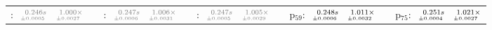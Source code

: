 \documentclass[a4paper,UKenglish]{lipics-v2016}
\begin{document}
\begin{table*}
\begin{adjustbox}{width=1.2\textwidth,center}
\begin{tabular}{rrrp{.1em}rrrp{.1em}rrrp{.1em}rrrp{.1em}rrr}
{\tiny \color{gray}{p$_{11}$}:}&$\substack{\mathmakebox[.7cm][r]{\color{gray}{0.246}}\color{gray}{s}\\{\mathmakebox[.7cm][r]{\scriptscriptstyle \color{gray}{\pm 0.0005}}}}$&$\substack{\mathmakebox[.7cm][r]{\color{gray}{1.000}}\color{gray}{\times}\\{\mathmakebox[.7cm][r]{\scriptscriptstyle \color{gray}{\pm 0.0027}}}}$&&{\tiny \color{gray}{p$_{27}$}:}&$\substack{\mathmakebox[.7cm][r]{\color{gray}{0.247}}\color{gray}{s}\\{\mathmakebox[.7cm][r]{\scriptscriptstyle \color{gray}{\pm 0.0006}}}}$&$\substack{\mathmakebox[.7cm][r]{\color{gray}{1.006}}\color{gray}{\times}\\{\mathmakebox[.7cm][r]{\scriptscriptstyle \color{gray}{\pm 0.0031}}}}$&&{\tiny \color{gray}{p$_{43}$}:}&$\substack{\mathmakebox[.7cm][r]{\color{gray}{0.247}}\color{gray}{s}\\{\mathmakebox[.7cm][r]{\scriptscriptstyle \color{gray}{\pm 0.0005}}}}$&$\substack{\mathmakebox[.7cm][r]{\color{gray}{1.005}}\color{gray}{\times}\\{\mathmakebox[.7cm][r]{\scriptscriptstyle \color{gray}{\pm 0.0029}}}}$&&{\tiny p$_{59}$:}&$\substack{\mathmakebox[.7cm][r]{0.248}s\\{\mathmakebox[.7cm][r]{\scriptscriptstyle \pm 0.0006}}}$&$\substack{\mathmakebox[.7cm][r]{1.011}\times\\{\mathmakebox[.7cm][r]{\scriptscriptstyle \pm 0.0032}}}$&&{\tiny p$_{75}$:}&$\substack{\mathmakebox[.7cm][r]{0.251}s\\{\mathmakebox[.7cm][r]{\scriptscriptstyle \pm 0.0004}}}$&$\substack{\mathmakebox[.7cm][r]{1.021}\times\\{\mathmakebox[.7cm][r]{\scriptscriptstyle \pm 0.0027}}}$\\

\end{tabular}
\end{adjustbox}
\end{table*}
\end{document}
